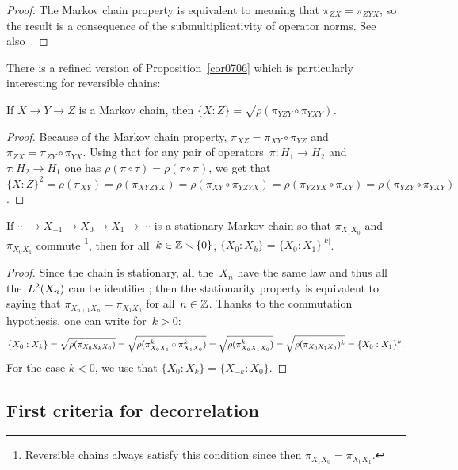 \begin{proof}
The Markov chain property is equivalent to meaning that $\pi_{ZX} = \pi_{ZYX}$,
so the result is a consequence of the submultiplicativity of operator norms.
See also~\cite[\S~VII-4]{Rosenblatt}.
\end{proof}

There is a refined version of Proposition~\ref{cor0706} which is particularly interesting
for reversible chains:
%
\begin{Pro}\label{pro0281}
If $X \to Y \to Z$ is a Markov chain, then $\{X:Z\} = \sqrt{\rho(\pi_{YZY}\circ\pi_{YXY})}$.
\end{Pro}

\begin{proof}
Because of the Markov chain property, $\pi_{XZ} = \pi_{XY}\circ\pi_{YZ}$
and $\pi_{ZX} = \pi_{ZY}\circ\pi_{YX}$.
Using that for any pair of operators~$\pi \colon H_1 \to H_2$ and~$\tau \colon H_2 \to H_1$
one has $\rho(\pi\circ\tau) = \rho(\tau\circ\pi)$,
we get that $\{X:Z\}^2 = \rho(\pi_{XY}) = \rho(\pi_{XYZYX}) = \rho(\pi_{XY}\circ\pi_{YZYX})
= \rho(\pi_{YZYX}\circ\pi_{XY}) = \rho(\pi_{YZY}\circ\pi_{YXY})$.\linebreak[1]\strut
\end{proof}

\begin{Cor}\label{cor5902}
If $\cdots \to X_{-1} \to X_{0} \to X_{1} \to \cdots$ is a stationary Markov chain
so that $\pi_{X_1X_0}$ and~$\pi_{X_0X_1}$ commute%
\footnote{Reversible chains always satisfy this condition
since then $\pi_{X_1X_0} = \pi_{X_0X_1}$.},
then for all~$k\in\mathbb{Z}\smallsetminus\{0\}$, $\{X_0:X_k\} = \{X_0:X_1\}^{|k|}$.
\end{Cor}

\begin{proof}
Since the chain is stationary, all the~$X_n$ have the same law
and thus all the~$\ldb(X_n)$ can be identified;
then the stationarity property is equivalent to saying that
$\pi_{X_{n+1}X_n} = \pi_{X_1X_0}$ for all~$n\in\mathbb{Z}$.
Thanks to the commutation hypothesis, one can write for~$k>0$:
\[ \{X_0:X_k\} = \sqrt{\rho(\pi_{X_0X_kX_0})}
= \sqrt{\rho(\pi_{X_0X_1}^k\circ\pi_{X_1X_0}^k)} \\
= \sqrt{\rho(\pi_{X_0X_1X_0}^k)}
= \sqrt{\rho(\pi_{X_0X_1X_0})^k} = \{X_0:X_1\}^k . \]
For the case $k<0$, we use that $\{X_0:X_k\} = \{X_{-k}:X_0\}$.
\end{proof}



\subsection{First criteria for decorrelation}\label{parCriteriaForDecorrelation}


